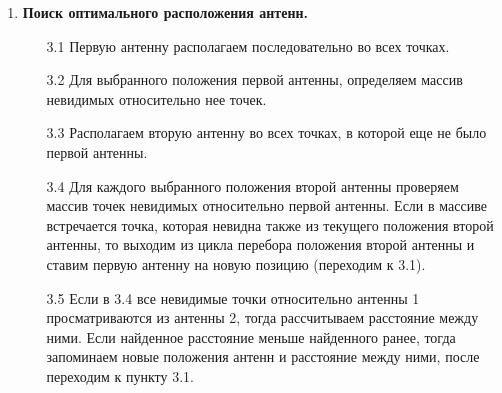 \begin{enumerate}
    \item \textbf{Поиск оптимального расположения антенн.}
    \begin{enumerate}
        \item[3.1] Первую антенну располагаем последовательно во всех точках.
        \item[3.2] Для выбранного положения первой антенны, определяем массив невидимых относительно нее точек.
        \item[3.3] Располагаем вторую антенну во всех точках, в которой еще не было первой антенны.
        \item[3.4] Для каждого выбранного положения второй антенны проверяем массив точек невидимых относительно первой антенны. Если в массиве встречается точка, которая невидна также из текущего положения второй антенны, то выходим из цикла перебора положения второй антенны и ставим первую антенну на новую позицию (переходим к 3.1).
        \item[3.5] Если в 3.4 все невидимые точки относительно антенны 1 просматриваются из антенны 2, тогда рассчитываем расстояние между ними. Если найденное расстояние меньше найденного ранее, тогда запоминаем новые положения антенн и расстояние между ними, после переходим к пункту 3.1.
    \end{enumerate}
\end{enumerate}
